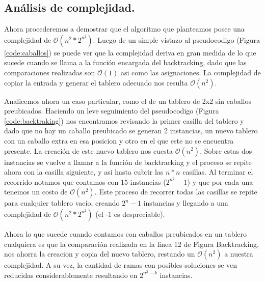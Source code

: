 \vspace*{0.6cm}





\subsection{Análisis de complejidad.}

\vspace*{0.3cm}

Ahora procederemos a demostrar que el algoritmo que planteamos posee una complejidad de $\mathcal{O}(n^2*2^{n^2})$. Luego de un simple vistazo al pseudocodigo (Figura \ref{code:caballos}) se puede ver que la complejidad deriva en gran medida de lo que sucede cuando se llama a la función encargada del backtracking, dado que las comparaciones realizadas son $\mathcal{O}(1)$ asi como las asignaciones. La complejidad de copiar la entrada y generar el tablero adecuado nos resulta $\mathcal{O}(n^2)$.

Analicemos ahora un caso particular, como el de un tablero de 2x2 sin caballos preubicados. Haciendo un leve seguimiento del pseudocodigo (Figura \ref{code:backtraking}) nos encontramos revisando la primer casilla del tablero y dado que no hay un caballo preubicado se generan 2 instancias, un nuevo tablero con un caballo extra en esa posicion y otro en el que este no se encuentra presente. La creación de este nuevo tablero nos cuesta $\mathcal{O}(n^2)$. Sobre estas dos instancias se vuelve a llamar a la función de backtracking y el proceso se repite ahora con la casilla siguiente, y asi hasta cubrir las $n*n$ casillas. Al terminar el recorrido notamos que contamos con 15 instancias ($2^{n^2} - 1$) y que por cada una tenemos un costo de $\mathcal{O}(n^2)$.
Este proceso de recorrer todas las casillas se repite para cualquier tablero vacío, creando $2^n -1$ instancias y llegando a una complejidad de $\mathcal{O}(n^2*2^{n^2})$ (el -1 es despreciable).

Ahora lo que sucede cuando contamos con caballos preubicados en un tablero cualquiera es que la comparación realizada en la linea 12 de Figura Backtracking, nos ahorra la creacion y copia del nuevo tablero, restando un $\mathcal{O}(n^2)$ a nuestra complejidad. A su vez, la cantidad de ramas con posibles soluciones se ven reducidas considerablemente resultando en $2^{n^2-k}$ instancias.

